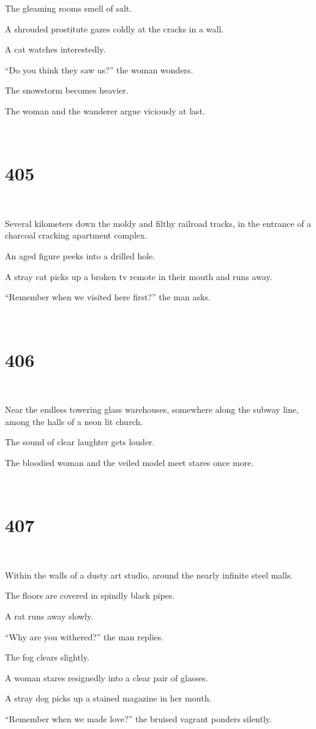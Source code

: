 \documentclass{report}
\begin{document}
The gleaming rooms smell of salt.

A shrouded prostitute gazes coldly at the cracks in a wall.

A cat watches interestedly.

``Do you think they saw us?'' the woman wonders.

The snowstorm becomes heavier.

The woman and the wanderer argue viciously at last.

~
\chapter*{405}
~

Several kilometers down the moldy and filthy railroad tracks, in the entrance of a charcoal cracking apartment complex.

An aged figure peeks into a drilled hole.

A stray cat picks up a broken tv remote in their mouth and runs away.

``Remember when we visited here first?'' the man asks.

~
\chapter*{406}
~

Near the endless towering glass warehouses, somewhere along the subway line, among the halls of a neon lit church.

The sound of clear laughter gets louder.

The bloodied woman and the veiled model meet stares once more.

~
\chapter*{407}
~

Within the walls of a dusty art studio, around the nearly infinite steel malls.

The floors are covered in spindly black pipes.

A rat runs away slowly.

``Why are you withered?'' the man replies.

The fog clears slightly.

A woman stares resignedly into a clear pair of glasses.

A stray dog picks up a stained magazine in her mouth.

``Remember when we made love?'' the bruised vagrant ponders silently.
\end{document}
